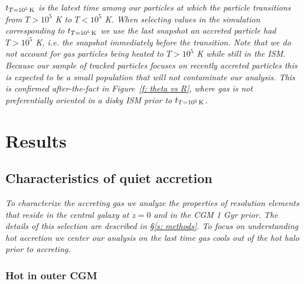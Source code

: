 \documentclass[fleqn,usenatbib]{mnras}
\newcommand{\tcon}{t_{T=10^5\,{\rm K}}}
\begin{document}
\textit{
$\tcon$ is the latest time among our particles at which the particle transitions from $T > 10^5$ K to $T< 10^5$ K.
When selecting values in the simulation corresponding to $\tcon$ we use the last snapshot an accreted particle had $T > 10^5$ K, i.e. the snapshot immediately before the transition.
Note that we do not account for gas particles being heated to $T > 10^5$ K while still in the ISM.
Because our sample of tracked particles focuses on recently accreted particles this is expected to be a small population that will not contaminate our analysis.
This is confirmed after-the-fact in Figure~\ref{f: theta vs R}, where gas is not preferentially oriented in a disky ISM prior to $\tcon$.
}

\section{Results}
\label{s: results}


\subsection{Characteristics of quiet accretion}
\label{s: characteristics}

\textit{
To characterize the accreting gas we analyze the properties of resolution elements that reside in the central galaxy at $z=0$ and in the CGM 1 Gyr prior.
The details of this selection are described in \S\ref{s: methods}.
To focus on understanding hot accretion we center our analysis on the last time gas cools out of the hot halo prior to accreting.
}


\subsubsection{Hot in outer CGM}
\label{s: inflowing gas phase}
\end{document}
